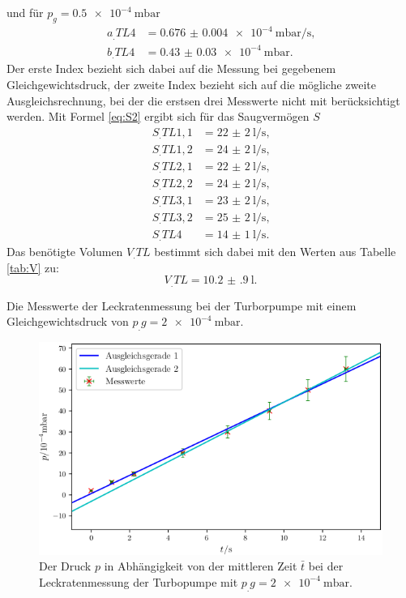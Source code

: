 und für $p_g = \SI{0.5e-4}{\milli\bar}$
\begin{align*}
a_.{TL4} &= \SI{0.676(4)e-4}{\milli\bar\per\second} \text{,}\\
b_.{TL4} &= \SI{0.43(3)e-4}{\milli\bar} \text{.}
\end{align*}
Der erste Index bezieht sich dabei auf die Messung bei gegebenem Gleichgewichtsdruck, der zweite Index bezieht sich auf die mögliche zweite Ausgleichsrechnung, bei der die erstsen drei Messwerte nicht mit berücksichtigt werden.
Mit Formel \eqref{eq:S2} ergibt sich für das Saugvermögen $S$
\begin{align*}
S_.{TL1,1} &= \SI{22(2)}{\litre\per\second} \text{,}\\
S_.{TL1,2} &= \SI{24(2)}{\litre\per\second} \text{,}\\
S_.{TL2,1} &= \SI{22(2)}{\litre\per\second} \text{,}\\
S_.{TL2,2} &= \SI{24(2)}{\litre\per\second} \text{,}\\
S_.{TL3,1} &= \SI{23(2)}{\litre\per\second} \text{,}\\
S_.{TL3,2} &= \SI{25(2)}{\litre\per\second} \text{,}\\
S_.{TL4}   &= \SI{14(1)}{\litre\per\second} \text{.}
\end{align*}
Das benötigte Volumen $V_.{TL}$ bestimmt sich dabei mit den Werten aus Tabelle \ref{tab:V} zu:
\[
V_.{TL} = \SI{10.2(9)}{\litre}\text{.}
\]

\begin{table}
\centering
\caption{Die Messwerte der Leckratenmessung bei der Turborpumpe mit einem Gleichgewichtsdruck von $p_.g = \SI{2e-4}{\milli\bar}$.}

\label{tab:TL1}
\end{table}

\begin{figure}
\centering
\includegraphics[width=\linewidth-70pt,height=\textheight-70pt,keepaspectratio]{content/images/TL1.png}
\caption{Der Druck $p$ in Abhängigkeit von der mittleren Zeit $\bar{t}$ bei der Leckratenmessung der Turbopumpe  mit $p_.g = \SI{2e-4}{\milli\bar}$.}
\label{fig:TL1}
\end{figure}


